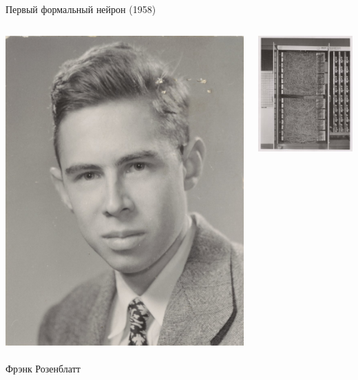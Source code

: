 \documentclass[notes,12pt, aspectratio=169]{beamer}
\begin{document}
\begin{frame}{Первый формальный нейрон (1958)}
\begin{columns}[T] %
	\begin{column}{.33\textwidth}
		\centering \includegraphics[scale=0.1]{rozen.jpg}\\
		\mbox{ } \\
		\color{blue} Фрэнк Розенблатт
	\end{column}%
	\hfill%
	\begin{column}{.33\textwidth}
		\centering \includegraphics[scale=0.54]{rozen_mark2.jpg}\\

\end{column}
\end{columns}
\end{frame}
\end{document}
